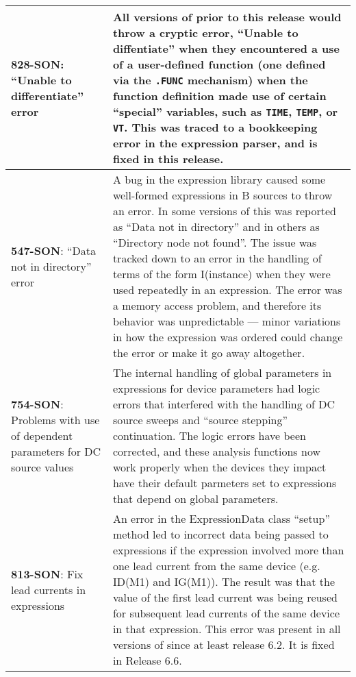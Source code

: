 {\begin{longtable}[h] {>{\raggedright\small}m{2in}|>{\raggedright\let\\\tabularnewline\small}m{3.5in}}
\textbf{828-SON}: ``Unable to differentiate'' error & All versions of \Xyce{} prior to this release would throw a cryptic error, ``Unable to diffentiate'' when they encountered a use of a user-defined function (one defined via the \texttt{.FUNC} mechanism) when the function definition made use of certain ``special'' variables, such as \texttt{TIME}, \texttt{TEMP}, or \texttt{VT}.  This was traced to a bookkeeping error in the expression parser, and is fixed in this release.  \\ \hline

\textbf{547-SON}: ``Data not in directory'' error & A bug in the expression library caused some well-formed expressions in B sources to throw an error.  In some versions of \Xyce{} this was reported as ``Data not in directory'' and in others as ``Directory node not found''.  The issue was tracked down to an error in the handling of terms of the form I(instance) when they were used repeatedly in an expression.  The error was a memory access problem, and therefore its behavior was unpredictable --- minor variations in how the expression was ordered could change the error or make it go away altogether. \\ \hline

\textbf{754-SON}: Problems with use of dependent parameters for DC source values & The internal handling of global parameters in expressions for device parameters had logic errors that interfered with the handling of DC source sweeps and ``source stepping'' continuation.  The logic errors have been corrected, and these analysis functions now work properly when the devices they impact have their default parmeters set to expressions that depend on global parameters. \\ \hline

     \textbf{813-SON}: Fix lead currents in expressions &  An error in the ExpressionData class ``setup'' method led to incorrect data being passed to expressions if the expression involved more than one lead current from the same device (e.g. ID(M1) and IG(M1)).  The result was that the value of the first lead current was being reused for subsequent lead currents of the same device in that expression.  This error was present in all versions of \Xyce{} since at least release 6.2.  It is fixed in Release 6.6.\\ \hline
     

\end{longtable}}
